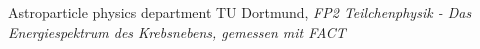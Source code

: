 \begin{thebibliography}{99}
  Astroparticle physics department TU Dortmund, \textit{FP2 Teilchenphysik - Das Energiespektrum des Krebsnebens, gemessen mit FACT}
\end{thebibliography}
